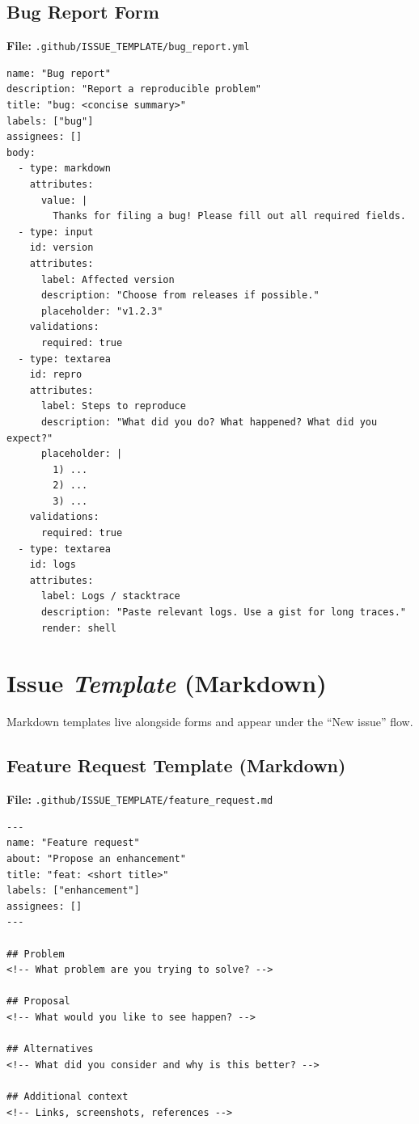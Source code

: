 \documentclass[11pt]{article}
\begin{document}
\subsection{Bug Report Form}
\noindent\textbf{File:} \texttt{.github/ISSUE\_TEMPLATE/bug\_report.yml}
\begin{verbatim}
name: "Bug report"
description: "Report a reproducible problem"
title: "bug: <concise summary>"
labels: ["bug"]
assignees: []
body:
  - type: markdown
    attributes:
      value: |
        Thanks for filing a bug! Please fill out all required fields.
  - type: input
    id: version
    attributes:
      label: Affected version
      description: "Choose from releases if possible."
      placeholder: "v1.2.3"
    validations:
      required: true
  - type: textarea
    id: repro
    attributes:
      label: Steps to reproduce
      description: "What did you do? What happened? What did you expect?"
      placeholder: |
        1) ...
        2) ...
        3) ...
    validations:
      required: true
  - type: textarea
    id: logs
    attributes:
      label: Logs / stacktrace
      description: "Paste relevant logs. Use a gist for long traces."
      render: shell
\end{verbatim}
\clearpage

\section{Issue \emph{Template} (Markdown)}
Markdown templates live alongside forms and appear under the ``New issue'' flow.

\subsection{Feature Request Template (Markdown)}
\noindent\textbf{File:} \texttt{.github/ISSUE\_TEMPLATE/feature\_request.md}
\begin{verbatim}
---
name: "Feature request"
about: "Propose an enhancement"
title: "feat: <short title>"
labels: ["enhancement"]
assignees: []
---

## Problem
<!-- What problem are you trying to solve? -->

## Proposal
<!-- What would you like to see happen? -->

## Alternatives
<!-- What did you consider and why is this better? -->

## Additional context
<!-- Links, screenshots, references -->
\end{verbatim}
\end{document}
